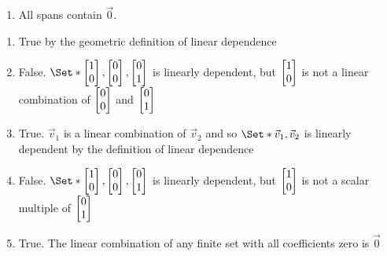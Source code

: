 \begin{exercises}
\begin{problist}
\begin{enumerate}
			\item All spans contain $\vec 0$.
		\end{enumerate}
		\begin{solution}
			\begin{enumerate}
				\item True by the geometric definition of linear dependence
				\item False. $\Set*{\mat{1\\0},\mat{0\\0},\mat{0\\1}}$ is linearly
				dependent, but $\mat{1\\0}$ is not a linear combination of $\mat{0\\0}$ and $\mat{0\\1}$
				\item True. $\vec{v}_{1}$ is a linear combination of $\vec{v}_{2}$ and so 
				$\Set*{\vec {v}_{1},\vec{v}_{2}}$ is linearly dependent by the definition
				of linear dependence
				\item False. $\Set*{\mat{1\\0},\mat{0\\0},\mat{0\\1}}$ is linearly dependent, 
				but $\mat{1\\0}$ is not a scalar multiple of $\mat{0\\1}$
				\item True. The linear combination of any finite set with all coefficients zero is $\vec {0}$
			\end{enumerate}
		\end{solution}
	\end{problist}
\end{exercises}
